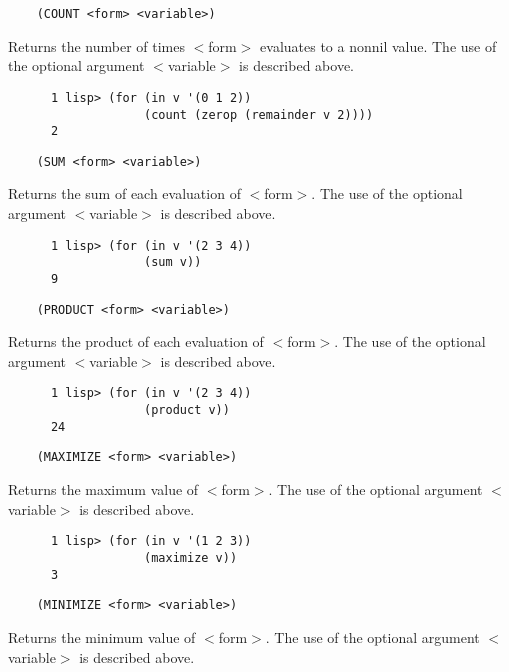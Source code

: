 \begin{verbatim}
    (COUNT <form> <variable>)
\end{verbatim}
      Returns the number of times $<$form$>$ evaluates to a nonnil value.
      The use of the optional argument $<$variable$>$ is described above.


\begin{verbatim}
      1 lisp> (for (in v '(0 1 2))
                   (count (zerop (remainder v 2))))
      2
\end{verbatim}

\begin{verbatim}
    (SUM <form> <variable>)
\end{verbatim}      

						Returns the sum of each evaluation of $<$form$>$. The use of the optional
      argument $<$variable$>$ is described above.


\begin{verbatim}
      1 lisp> (for (in v '(2 3 4))
                   (sum v))
      9
\end{verbatim}

\begin{verbatim}
    (PRODUCT <form> <variable>)
\end{verbatim}
      
					Returns the product of each evaluation of $<$form$>$. The use of the
					optional argument $<$variable$>$ is described above.
 
\begin{verbatim}
      1 lisp> (for (in v '(2 3 4))
                   (product v))
      24
\end{verbatim}

\begin{verbatim}
    (MAXIMIZE <form> <variable>)
\end{verbatim}
      Returns the maximum value of $<$form$>$. The use of the optional 
						argument $<$variable$>$ is described above.

\begin{verbatim}
      1 lisp> (for (in v '(1 2 3))
                   (maximize v))
      3
\end{verbatim}

\begin{verbatim}
    (MINIMIZE <form> <variable>)
\end{verbatim}
      Returns the minimum value of $<$form$>$. The use of the optional 
						argument $<$variable$>$ is described above.
 
